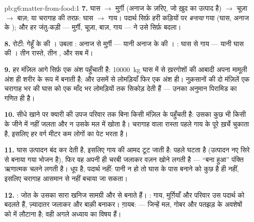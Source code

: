 \begin{solution}{pb:g6:matter-from-food:1}
\textbf{7.} घास $\rightarrow$ मुर्ग़ी (अनाज के ज़रिए, जो ख़ुद  का
उत्पाद है) $\rightarrow$ चूज़ा $\rightarrow$ बाज़; या चरागाह की तरफ़:
घास $\rightarrow$ गाय। पदार्थ सिर्फ़ हरी कड़ियों पर \emph{बनाया} गया
(घास, अनाज के ); और हर जंतु-कड़ी --- मुर्ग़ी, चूज़ा, बाज़, गाय ---
ने उसे सिर्फ़ बदला।

\textbf{8.} रोटी: गेहूँ के  की । उबला : अनाज से
मुर्ग़ी --- यानी अनाज के  की । : घास से गाय --- यानी
घास की । तीन रास्ते, तीन , और सब  में।

\textbf{9.} हर मंज़िल आगे सिर्फ़ एक अंश पहुँचाती है: \qty{10000}{kg}
घास में से ख़रगोशों की आबादी अपना मामूली अंश ही शरीर के रूप में बनाती
है; और उसमें से लोमड़ियाँ फिर एक अंश ही। नुक़सानों की दो मंज़िलें एक
चरागाह भर की घास को एक माँद भर लोमड़ियों तक सिकोड़ देती हैं --- उनका
अनुमान पिरामिड का गणित ही है।

\textbf{10.} सीधे खाने पर क्यारी की उपज परिवार तक बिना किसी 
मंज़िल के पहुँचती है: उसका कुछ भी किसी  के जीने में नहीं जलता और न
उसके मल में खोता है। चरागाह वाला रास्ता पहले गाय के पूरे ख़र्चे चुकाता
है, इसलिए हर वर्ग मीटर कम लोगों का पेट भरता है।

\textbf{11.} घास उत्पादन बंद कर देती है, इसलिए गाय की आमद टूट जाती है:
पहले  घटता है (उत्पादन नए सिरे से बनाया गया भोजन है), फिर वह अपनी ही
चरबी जलाकर वज़न खोने लगती है --- ``बना हुआ'' पंक्ति ऋणात्मक चलने लगती
है। धूप  है, पदार्थ नहीं: पानी न हो तो घास के पास बनाने को कुछ है
ही नहीं, इसलिए चरागाह आसमान से नहीं बचाया जा सकता।

\textbf{12.} : जोत के  उसका सारा  खनिज सामग्री
और  से बनाते हैं। : गाय, मुर्ग़ियाँ और परिवार उस पदार्थ
को बदलते हैं, ज़्यादातर जलाकर और बाक़ी बनाकर। ग़ायब:  --- जिन्हें
मल, गोबर और पतझड़ के अवशेषों को  में लौटाना है; वही अगले
अध्याय का विषय हैं।
\end{solution}
